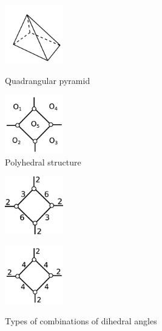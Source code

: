 \documentclass[suppldata, dvipdfmx]{interact}
\theoremstyle{plain}%
\theoremstyle{definition}
\theoremstyle{remark}
\theoremstyle{problemstyle}
\begin{document}
\begin{figure}[h!tbp]
  \begin{minipage}[t]{0.5\textwidth}
   \centering
   \includegraphics[width=1in, keepaspectratio]{./img/HexahedraWithSphericalFaces/pentahedralPyramid/pyramid.jpg}
   \caption{Quadrangular pyramid}
   \label{fig:quadrangularPyramid}
  \end{minipage}
 \hspace*{\fill}
  \begin{minipage}[t]{0.5\textwidth}
   \centering
   \includegraphics[width=1in, keepaspectratio]{./img/HexahedraWithSphericalFaces/pentahedralPyramid/faces.jpg}
   \caption{Polyhedral structure}
   \label{fig:quadrangularPyramidFaces}
  \end{minipage}
 \hspace*{\fill}
\end{figure}

\begin{figure}[h!tbp]
 \hspace*{\fill}
 \begin{minipage}[t]{0.24\textwidth}
   \centering
   \includegraphics[width=1in,
   keepaspectratio]{./img/HexahedraWithSphericalFaces/pentahedralPyramid/a.jpg}
   \label{fig:quadrangularPyramid1}
 \end{minipage}
 \hspace*{\fill}
 \begin{minipage}[t]{0.24\textwidth}
   \centering
   \includegraphics[width=1in, keepaspectratio]{./img/HexahedraWithSphericalFaces/pentahedralPyramid/b.jpg}
   \label{fig:quadrangularPyramid2}
 \end{minipage}
 \hspace*{\fill}
 \caption{Types of combinations of dihedral angles}
  \label{fig:quadrangularPyramidCombinations}
\end{figure}
\end{document}
